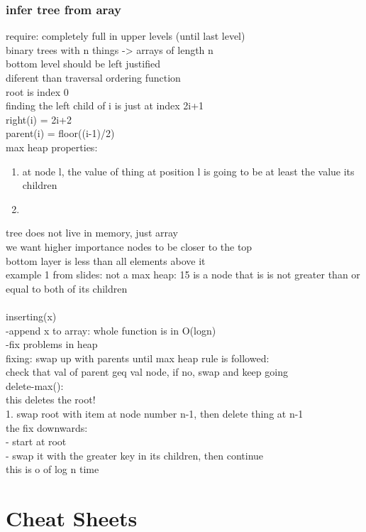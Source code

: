\documentclass{article}
\begin{document}
\subsubsection{infer tree from aray}
require: completely full in upper levels (until last level)\\
binary trees with n things -> arrays of length n\\
bottom level should be left justified\\
diferent than traversal ordering function\\
root is index 0\\
finding the left child of i is just at index 2i+1\\
right(i) = 2i+2\\
parent(i) = floor((i-1)/2)\\
max heap properties:
\begin{enumerate}
    \item at node l, the value of thing at position l is going to be at least the value its children\\
    \item 
\end{enumerate}
tree does not live in memory, just array\\
we want higher importance nodes to be closer to the top\\
bottom layer is less than all elements above it\\
example 1 from slides: not a max heap: 15 is a node that is is not greater than or equal to both of its children\\
\\
inserting(x)\\
-append x to array: whole function is in O(logn)\\
-fix problems in heap\\
fixing: swap up with parents until max heap rule is followed:\\
check that val of parent geq val node, if no, swap and keep going\\
delete-max():\\
this deletes the root! \\
1. swap root with item at node number n-1, then delete thing at n-1\\
the fix downwards:\\
- start at root\\
- swap it with the greater key in its children, then continue\\
this is o of log n time
\section{Cheat Sheets}
\end{document}
